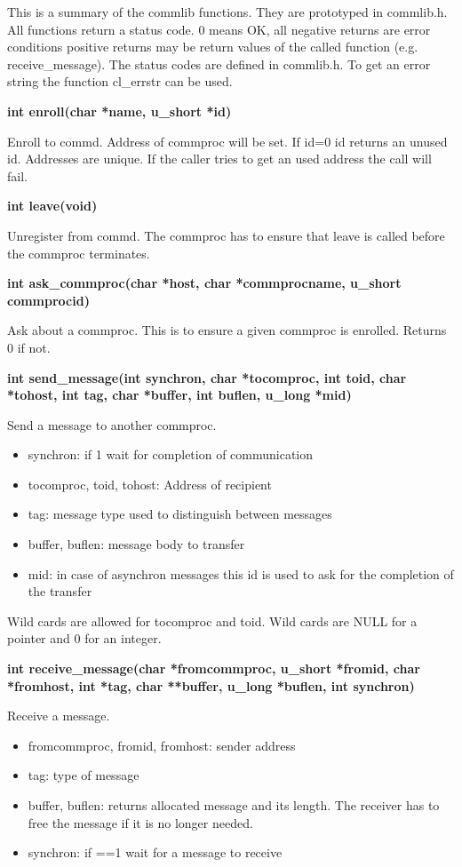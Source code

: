 This is a summary of the commlib functions. They are prototyped in
commlib.h. All functions return a status code. 0 means OK, all
negative returns are error conditions positive returns may be return
values of the called function (e.g. receive\_message). The status
codes are defined in commlib.h. To get an error string the function
cl\_errstr can be used.
\bigskip

{\bf int enroll(char *name, u\_short *id)}
\bigskip

Enroll to commd. Address of commproc will be set.
If id=0 id returns an unused id.
Addresses are unique. If the caller tries to get an used address the call
will fail.
\bigskip

{\bf int leave(void)}
\bigskip

Unregister from commd. The commproc has to ensure that leave is called
before the commproc terminates.
\bigskip

{\bf int ask\_commproc(char *host, char *commprocname, u\_short commprocid)}
\bigskip

Ask about a commproc. This is to ensure a given commproc is enrolled.
Returns 0 if not.
\bigskip


{\bf int send\_message(int synchron, char *tocomproc, int toid, char *tohost,
                     int tag, char *buffer, int buflen, u\_long *mid)}
\bigskip

Send a message to another commproc.

\begin{itemize}
\item synchron: if 1 wait for completion of communication

\item tocomproc, toid, tohost: Address of recipient
\item tag: message type used to distinguish between messages
\item buffer, buflen: message body to transfer
\item mid: in case of asynchron messages this id is used to ask for the completion of the transfer
\end{itemize}

Wild cards are allowed for tocomproc and toid. Wild cards are NULL for a pointer 
and 0 for an integer.
\bigskip

{\bf int receive\_message(char *fromcommproc, u\_short *fromid, 
		        char *fromhost, int *tag, char **buffer, 
		        u\_long *buflen, int synchron)}
\bigskip

Receive a message.
\begin{itemize}
\item fromcommproc, fromid, fromhost: sender address
\item tag: type of message
\item buffer, buflen: returns allocated message and its length. The receiver 
      has to free the message if it is no longer needed.
\item synchron: if ==1 wait for a message to receive
\end{itemize}

